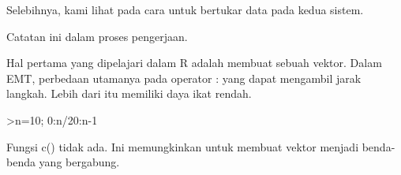 \documentclass[a4paper,10pt]{article}
\begin{document}
\begin{eulernotebook}
\begin{eulercomment}
\begin{eulercomment}
\begin{eulercomment}
\begin{eulercomment}
\begin{eulercomment}
Selebihnya, kami lihat pada cara untuk bertukar data pada kedua
sistem.
\end{eulercomment}
\begin{eulercomment}
Catatan ini dalam proses pengerjaan.
\end{eulercomment}
\begin{eulercomment}
Hal pertama yang dipelajari dalam R adalah membuat sebuah vektor.
Dalam EMT, perbedaan utamanya pada operator :  yang dapat mengambil
jarak langkah. Lebih dari itu memiliki daya ikat rendah.
\end{eulercomment}
\begin{eulerprompt}
>n=10; 0:n/20:n-1
\end{eulerprompt}
\begin{euleroutput}
  [0,  0.5,  1,  1.5,  2,  2.5,  3,  3.5,  4,  4.5,  5,  5.5,  6,  6.5,
  7,  7.5,  8,  8.5,  9]
\end{euleroutput}
\begin{eulercomment}
Fungsi c() tidak ada. Ini memungkinkan untuk membuat  vektor menjadi
benda-benda yang bergabung.


\end{eulercomment}
\end{eulercomment}
\end{eulercomment}
\end{eulercomment}
\end{eulercomment}
\end{eulernotebook}
\end{document}
